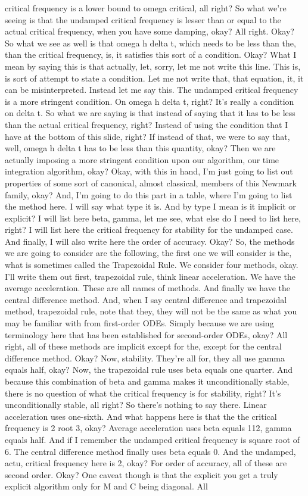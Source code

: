 \documentclass[10pt]{article}
\begin{document}
critical frequency is a lower bound to omega critical, all right? So what we're seeing is that the undamped critical frequency is lesser than or equal to the actual critical frequency, when you have some damping, okay? All right. Okay? So what we see as well is that omega h delta t, which needs to be less than the, than the critical frequency, is, it satisfies this sort of a condition. Okay? What I mean by saying this is that actually, let, sorry, let me not write this line. This is, is sort of attempt to state a condition. Let me not write that, that equation, it, it can be misinterpreted. Instead let me say this. The undamped critical frequency is a more stringent condition. On omega h delta t, right? It's really a condition on delta t. So what we are saying is that instead of saying that it has to be less than the actual critical frequency, right? Instead of using the condition that I have at the bottom of this slide, right? If instead of that, we were to say that, well, omega h delta t has to be less than this quantity, okay? Then we are actually imposing a more stringent condition upon our algorithm, our time integration algorithm, okay? Okay, with this in hand, I'm just going to list out properties of some sort of canonical, almost classical, members of this Newmark family, okay? And, I'm going to do this part in a table, where I'm going to list the method here. I will say what type it is. And by type I mean is it implicit or explicit? I will list here beta, gamma, let me see, what else do I need to list here, right? I will list here the critical frequency for stability for the undamped case. And finally, I will also write here the order of accuracy. Okay? So, the methods we are going to consider are the following, the first one we will consider is the, what is sometimes called the Trapezoidal Rule. We consider four methods, okay. I'll write them out first, trapezoidal rule, think linear acceleration. We have the average acceleration. These are all names of methods. And finally we have the central difference method. And, when I say central difference and trapezoidal method, trapezoidal rule, note that they, they will not be the same as what you may be familiar with from first-order ODEs. Simply because we are using terminology here that has been established for second-order ODEs, okay? All right, all of these methods are implicit except for the, except for the central difference method. Okay? Now, stability. They're all for, they all use gamma equals half, okay? Now, the trapezoidal rule uses beta equals one quarter. And because this combination of beta and gamma makes it unconditionally stable, there is no question of what the critical frequency is for stability, right? It's unconditionally stable, all right? So there's nothing to say there. Linear acceleration uses one-sixth. And what happens here is that the the critical frequency is 2 root 3, okay? Average acceleration uses beta equals 112, gamma equals half. And if I remember the undamped critical frequency is square root of 6. The central difference method finally uses beta equals 0. And the undamped, actu, critical frequency here is 2, okay? For order of accuracy, all of these are second order. Okay? One caveat though is that the explicit you get a truly explicit algorithm only for M and C being diagonal. All 
\end{document}
